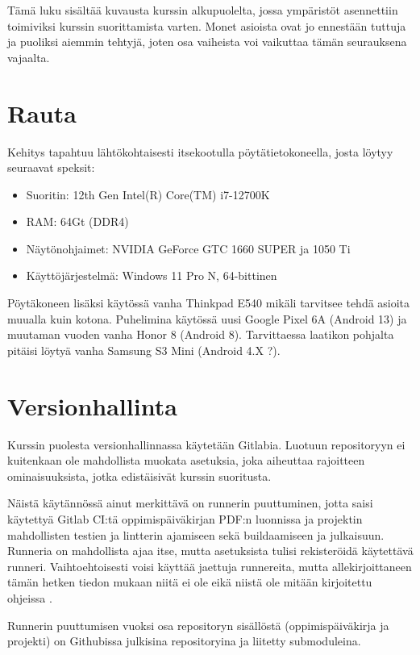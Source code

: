 Tämä luku sisältää kuvausta kurssin alkupuolelta, jossa ympäristöt asennettiin
toimiviksi kurssin suorittamista varten. Monet asioista ovat jo ennestään
tuttuja ja puoliksi aiemmin tehtyjä, joten osa vaiheista voi vaikuttaa tämän
seurauksena vajaalta.

\section{Rauta}

Kehitys tapahtuu lähtökohtaisesti itsekootulla pöytätietokoneella, josta
löytyy seuraavat speksit:
\begin{itemize}
    \item Suoritin: 12th Gen Intel(R) Core(TM) i7-12700K
    \item RAM: 64Gt (DDR4)
    \item Näytönohjaimet: NVIDIA GeForce GTC 1660 SUPER ja 1050 Ti
    \item Käyttöjärjestelmä: Windows 11 Pro N, 64-bittinen
\end{itemize}

Pöytäkoneen lisäksi käytössä vanha Thinkpad E540 mikäli tarvitsee tehdä asioita
muualla kuin kotona. Puhelimina käytössä uusi Google Pixel 6A (Android 13) ja
muutaman vuoden vanha Honor 8 (Android 8). Tarvittaessa laatikon pohjalta
pitäisi löytyä vanha Samsung S3 Mini (Android 4.X ?).

\section{Versionhallinta}

Kurssin puolesta versionhallinnassa käytetään Gitlabia. Luotuun repositoryyn
ei kuitenkaan ole mahdollista muokata asetuksia, joka aiheuttaa rajoitteen
ominaisuuksista, jotka edistäisivät kurssin suoritusta.

Näistä käytännössä ainut merkittävä on runnerin puuttuminen, jotta saisi
käytettyä Gitlab CI:tä oppimispäiväkirjan PDF:n luonnissa ja projektin
mahdollisten testien ja lintterin ajamiseen sekä buildaamiseen ja julkaisuun.
Runneria on mahdollista ajaa itse, mutta asetuksista tulisi rekisteröidä
käytettävä runneri. Vaihtoehtoisesti voisi käyttää jaettuja runnereita, mutta
allekirjoittaneen tämän hetken tiedon mukaan niitä ei ole eikä niistä ole mitään
kirjoitettu ohjeissa \parencite{TuniIntraGitlab}.

Runnerin puuttumisen vuoksi osa repositoryn sisällöstä (oppimispäiväkirja ja
projekti) on Githubissa julkisina repositoryina ja liitetty submoduleina.

